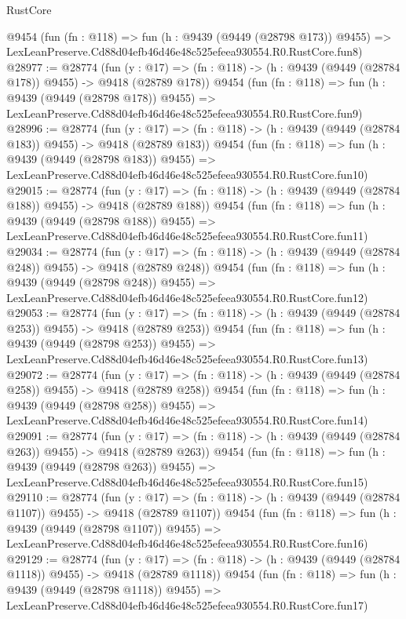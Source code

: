 \begin{lexlean}{RustCore}
\begin{coremodule}
    @9454
    (fun (fn : @118) =>
    fun (h : @9439 (@9449 (@28798 @173)) @9455) =>
    LexLeanPreserve.Cd88d04efb46d46e48c525efeea930554.R0.RustCore.fun8)
@28977 := @28774
    (fun (y : @17) => (fn : @118) -> (h : @9439 (@9449 (@28784 @178)) @9455) -> @9418 (@28789 @178))
    @9454
    (fun (fn : @118) =>
    fun (h : @9439 (@9449 (@28798 @178)) @9455) =>
    LexLeanPreserve.Cd88d04efb46d46e48c525efeea930554.R0.RustCore.fun9)
@28996 := @28774
    (fun (y : @17) => (fn : @118) -> (h : @9439 (@9449 (@28784 @183)) @9455) -> @9418 (@28789 @183))
    @9454
    (fun (fn : @118) =>
    fun (h : @9439 (@9449 (@28798 @183)) @9455) =>
    LexLeanPreserve.Cd88d04efb46d46e48c525efeea930554.R0.RustCore.fun10)
@29015 := @28774
    (fun (y : @17) => (fn : @118) -> (h : @9439 (@9449 (@28784 @188)) @9455) -> @9418 (@28789 @188))
    @9454
    (fun (fn : @118) =>
    fun (h : @9439 (@9449 (@28798 @188)) @9455) =>
    LexLeanPreserve.Cd88d04efb46d46e48c525efeea930554.R0.RustCore.fun11)
@29034 := @28774
    (fun (y : @17) => (fn : @118) -> (h : @9439 (@9449 (@28784 @248)) @9455) -> @9418 (@28789 @248))
    @9454
    (fun (fn : @118) =>
    fun (h : @9439 (@9449 (@28798 @248)) @9455) =>
    LexLeanPreserve.Cd88d04efb46d46e48c525efeea930554.R0.RustCore.fun12)
@29053 := @28774
    (fun (y : @17) => (fn : @118) -> (h : @9439 (@9449 (@28784 @253)) @9455) -> @9418 (@28789 @253))
    @9454
    (fun (fn : @118) =>
    fun (h : @9439 (@9449 (@28798 @253)) @9455) =>
    LexLeanPreserve.Cd88d04efb46d46e48c525efeea930554.R0.RustCore.fun13)
@29072 := @28774
    (fun (y : @17) => (fn : @118) -> (h : @9439 (@9449 (@28784 @258)) @9455) -> @9418 (@28789 @258))
    @9454
    (fun (fn : @118) =>
    fun (h : @9439 (@9449 (@28798 @258)) @9455) =>
    LexLeanPreserve.Cd88d04efb46d46e48c525efeea930554.R0.RustCore.fun14)
@29091 := @28774
    (fun (y : @17) => (fn : @118) -> (h : @9439 (@9449 (@28784 @263)) @9455) -> @9418 (@28789 @263))
    @9454
    (fun (fn : @118) =>
    fun (h : @9439 (@9449 (@28798 @263)) @9455) =>
    LexLeanPreserve.Cd88d04efb46d46e48c525efeea930554.R0.RustCore.fun15)
@29110 := @28774
    (fun (y : @17) =>
    (fn : @118) -> (h : @9439 (@9449 (@28784 @1107)) @9455) -> @9418 (@28789 @1107))
    @9454
    (fun (fn : @118) =>
    fun (h : @9439 (@9449 (@28798 @1107)) @9455) =>
    LexLeanPreserve.Cd88d04efb46d46e48c525efeea930554.R0.RustCore.fun16)
@29129 := @28774
    (fun (y : @17) =>
    (fn : @118) -> (h : @9439 (@9449 (@28784 @1118)) @9455) -> @9418 (@28789 @1118))
    @9454
    (fun (fn : @118) =>
    fun (h : @9439 (@9449 (@28798 @1118)) @9455) =>
    LexLeanPreserve.Cd88d04efb46d46e48c525efeea930554.R0.RustCore.fun17)

\end{coremodule}
\end{lexlean}
